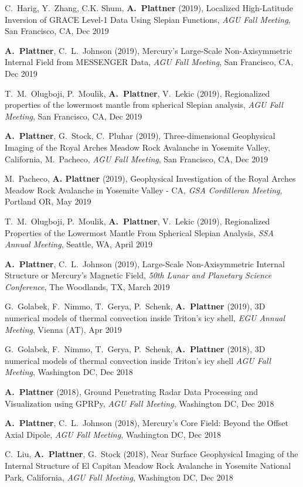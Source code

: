 \documentclass[10pt]{article}
\begin{document}
\spcp C.~Harig, Y.~Zhang, C.K. Shum, \textbf{A.~Plattner} (2019),
Localized High-Latitude Inversion of GRACE Level-1 Data Using Slepian Functions,
\emph{AGU Fall Meeting}, San Francisco, CA, Dec 2019

\spcp \textbf{A.~Plattner}, C.~L.~Johnson (2019), Mercury's
Large-Scale Non-Axisymmetric Internal Field from MESSENGER Data,
\emph{AGU Fall Meeting}, San Francisco, CA, Dec 2019

\spcp T.~M.~Olugboji, P.~Moulik, \textbf{A.~Plattner}, V.~Lekic (2019),
Regionalized properties of the lowermost mantle from spherical Slepian analysis,
\emph{AGU Fall Meeting}, San Francisco, CA, Dec 2019

\spcp \textbf{A.~Plattner}, G.~Stock, C.~Pluhar (2019),
Three-dimensional Geophysical Imaging of the Royal Arches Meadow Rock
Avalanche in Yosemite Valley, California, M.~Pacheco, \emph{AGU Fall
Meeting}, San Francisco, CA, Dec 2019

\spcp M.~Pacheco, \textbf{A. Plattner} (2019), Geophysical
Investigation of the Royal Arches Meadow Rock Avalanche in Yosemite
Valley - CA, \emph{GSA Cordilleran Meeting}, Portland OR, May 2019

\spcp T.~M.~Olugboji, P.~Moulik, \textbf{A.~Plattner}, V.~Lekic
(2019), Regionalized Properties of the Lowermost Mantle From Spherical
Slepian Analysis, \emph{SSA Annual Meeting}, Seattle, WA, April 2019

\spcp \textbf{A.~Plattner}, C.~L.~Johnson (2019),
Large-Scale Non-Axisymmetric Internal Structure or Mercury's Magnetic Field,
\emph{50th Lunar and Planetary Science Conference},
The Woodlands, TX, March 2019

\spcp G.~Golabek, F.~Nimmo, T.~Gerya, P.~Schenk, \textbf{A.~Plattner}
(2019), 3D numerical models of thermal convection inside Triton’s icy
shell, \emph{EGU Annual Meeting}, Vienna (AT), Apr 2019

\spcp G.~Golabek, F.~Nimmo, T.~Gerya, P.~Schenk, \textbf{A.~Plattner} (2018),
3D numerical models of thermal convection inside Triton's icy shell
\emph{AGU Fall Meeting}, Washington DC, Dec 2018

\spcp \textbf{A.~Plattner} (2018),
Ground Penetrating Radar Data Processing and Visualization using
GPRPy,
\emph{AGU Fall Meeting}, Washington DC, Dec 2018

\spcp \textbf{A.~Plattner}, C.~L.~Johnson (2018), 
Mercury's Core Field: Beyond the Offset Axial Dipole,
\emph{AGU Fall Meeting}, Washington DC, Dec 2018 


\spcp
C.~Liu, \textbf{A.~Plattner}, G.~Stock (2018),
Near Surface Geophysical Imaging of the Internal
Structure of El Capitan Meadow Rock Avalanche in Yosemite National
Park, California,
\emph{AGU Fall Meeting}, Washington DC, Dec 2018
\end{document}
